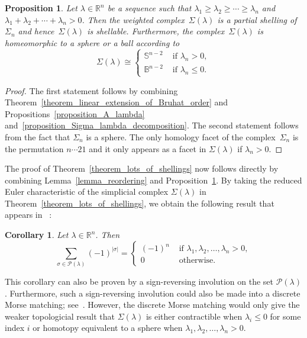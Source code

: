 \documentclass[10pt]{amsart}
\newtheorem{prop}[theorem]{Proposition}
\newtheorem{coro}[theorem]{Corollary}
\theoremstyle{definition}
\newcommand{\Bbbb}{\mathbb{B}}
\newcommand{\Rrr}{\mathbb{R}}
\newcommand{\Sss}{\mathbb{S}}
\newcommand{\lambdaweaklydecreasing}
{\lambda_{1} \geq \lambda_{2} \geq \cdots \geq \lambda_{n}}
\newcommand{\lambdasumpositive}
{\lambda_{1} + \lambda_{2} + \cdots + \lambda_{n} > 0}
\begin{document}
\begin{prop}
Let $\lambda \in \Rrr^{n}$ be a sequence such that
$\lambdaweaklydecreasing$ and 
$\lambdasumpositive$.
Then the weighted complex~$\Sigma(\lambda)$
is a partial shelling of $\Sigma_{n}$
and hence~$\Sigma(\lambda)$ is shellable.
Furthermore,
the complex~$\Sigma(\lambda)$ is homeomorphic to a sphere or a ball
according to
$$
\Sigma(\lambda)
\cong
\begin{cases}
\Sss^{n-2} & \text{ if } \lambda_{n} > 0, \\
\Bbbb^{n-2} & \text{ if } \lambda_{n} \leq 0.
\end{cases}
$$
\label{proposition_lots_of_shellings}
\end{prop}
\begin{proof}
The first statement follows by combining
Theorem~\ref{theorem_linear_extension_of_Bruhat_order}
and
Propositions~\ref{proposition_A_lambda}
and~\ref{proposition_Sigma_lambda_decomposition}.
The second statement follows
from the fact that $\Sigma_{n}$ is a sphere.
The only homology facet of the complex~$\Sigma_{n}$
is the permutation $n \cdots 21$
and it only appears as a facet in
$\Sigma(\lambda)$ if $\lambda_{n} > 0$.
\end{proof}



The proof of Theorem~\ref{theorem_lots_of_shellings}
now follows directly by combining
Lemma~\ref{lemma_reordering}
and
Proposition~\ref{proposition_lots_of_shellings}.
By taking the reduced Euler characteristic
of the simplicial complex $\Sigma(\lambda)$ in
Theorem~\ref{theorem_lots_of_shellings},
we obtain the following result 
that appears in~\cite[Corollary~A.3]{Morel} :


\begin{coro}
Let $\lambda \in \Rrr^{n}$.
Then
$$
   \sum_{\sigma \in \mathcal{P}(\lambda)} (-1)^{|\sigma|} =
   \begin{cases}
   (-1)^{n}   & \text{ if  } \lambda_{1}, \lambda_{2}, \ldots, \lambda_{n} > 0,  \\
   0        & \text{ otherwise. }
   \end{cases}
$$
\end{coro}

This corollary can also be proven by a sign-reversing involution
on the set $\mathcal{P}(\lambda)$. 
Furthermore, such a sign-reversing involution could
also be made into a discrete Morse matching;
see~\cite{Forman}.
However, the discrete Morse matching would only
give the weaker topologicial result that $\Sigma(\lambda)$
is either contractible when $\lambda_{i} \leq 0$
for some index $i$
or
homotopy equivalent to a sphere when
$\lambda_{1}, \lambda_{2}, \ldots, \lambda_{n} > 0$.
\end{document}
